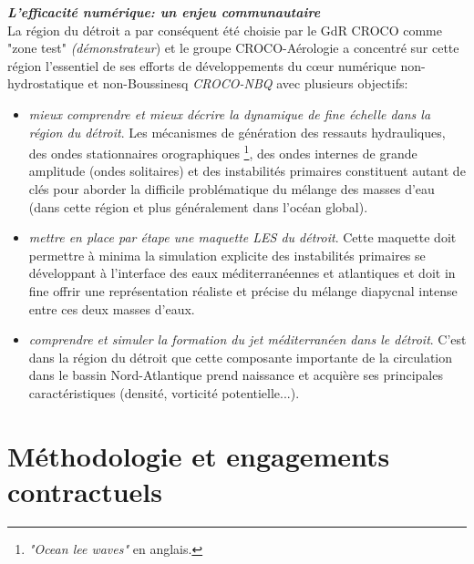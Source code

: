 \documentclass[a4paper,11pt]{report}
\begin{document}
\noindent \textbf{\textit{L'efficacité numérique: un enjeu communautaire}}\\
La région du détroit a par conséquent été choisie par le GdR CROCO comme "zone test" \textit{(démonstrateur}) et le groupe CROCO-Aérologie a concentré sur cette région l'essentiel de ses efforts de développements du cœur numérique non-hydrostatique et non-Boussinesq \textit{CROCO-NBQ} avec plusieurs objectifs:
\begin{itemize}
 \item \textit{mieux comprendre et mieux décrire la dynamique de fine échelle dans la région du détroit}. Les mécanismes de génération des ressauts hydrauliques, des ondes stationnaires orographiques \footnote{\textit{"Ocean lee waves"} en anglais.}, des ondes internes de grande amplitude (ondes solitaires) et des instabilités primaires     constituent autant de clés pour aborder la difficile problématique du mélange des masses d'eau (dans cette région et plus généralement dans l'océan global).
 \item  \textit{mettre en place par étape une maquette LES du détroit}. Cette maquette doit permettre à minima la simulation explicite des instabilités primaires se développant à l'interface des eaux méditerranéennes et atlantiques et doit in fine offrir une représentation réaliste et précise du mélange diapycnal intense entre ces deux masses d'eaux.
 \item \textit{comprendre et simuler la formation du jet méditerranéen dans le détroit}. C'est dans la région du détroit que cette composante importante de la circulation dans le bassin Nord-Atlantique prend naissance et acquière ses principales caractéristiques (densité, vorticité potentielle...).
\end{itemize}

\section{Méthodologie et engagements contractuels}
\end{document}
